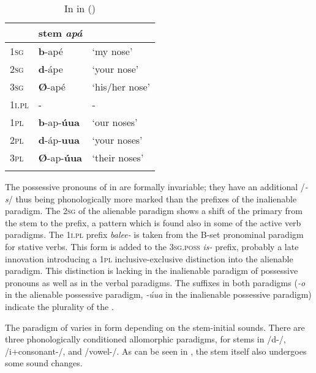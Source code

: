 \documentclass[output=paper]{LSP/langsci}
\begin{document}
\begin{table}
\caption{In in  (\citealt[52]{Graczyk2007})} \label{crowinalienablepossession}
\begin{tabular}{ l l l }
\lsptoprule
& stem \textit{apá}  & \\
\midrule	
\textsc{1sg} & \textbf{b}-apé & `my nose' \\
 
\textsc{2sg} & \textbf{d}-ápe	 & `your nose' \\
 
\textsc{3sg} & \textbf{Ø}-apé & `his/her nose' \\
 
\textsc{1i.pl}	& -	& - \\
 
\textsc{1pl} & \textbf{b}-ap-\textbf{úua}	& `our noses' \\
 
\textsc{2pl} & \textbf{d}-áp-\textbf{uua}	& `your noses' \\
 
\textsc{3pl} & \textbf{Ø}-ap-\textbf{úua}	& `their noses' \\
\lspbottomrule
\end{tabular}
\end{table}

The possessive pronouns of  in  are formally invariable; they have an additional /\textit{-s}/ thus being phonologically more marked than the prefixes of the inalienable paradigm. The \textsc{2sg}  of the alienable paradigm shows a shift of the primary  from the stem to the prefix, a pattern which is found also in some of the active verb paradigms. The \textsc{1i.pl} prefix \textit{balee-} is taken from the B-set pronominal paradigm for stative verbs. This form is added to the \textsc{3sg.poss} \textit{is-} prefix, probably a late innovation introducing a \textsc{1pl} inclusive-exclusive distinction into the alienable paradigm. This distinction is lacking in the inalienable paradigm of possessive pronouns as well as in the verbal paradigms. The suffixes in both paradigms (\textit{-o} in the alienable possessive paradigm, \textit{-úua} in the inalienable possessive paradigm) indicate the plurality of the .

The paradigm of  varies in form depending on the stem-initial sounds. There are three phonologically conditioned allomorphic paradigms, for stems in /d-/, /i+consonant-/, and /vowel-/. As can be seen in , the stem itself also undergoes some sound changes.
\end{document}
